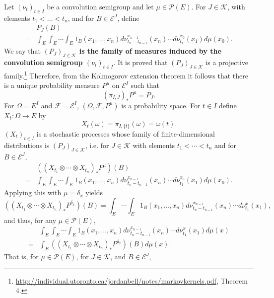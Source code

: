 \documentclass{article}
\theoremstyle{definition}
\begin{document}
Let $(\nu_t)_{t  \in I}$ be a convolution semigroup and let $\mu \in \mathscr{P}(E)$.
For $J \in \mathscr{K}$, with elements $t_1<\ldots<t_n$, and for $B \in \mathscr{E}^J$,
define
\begin{equation}
\begin{split}
&P_J(B)\\
=&\int_E \int_E \cdots \int_E 1_B(x_1,\ldots,x_n)
d\nu_{t_n-t_{n-1}}^{x_{n-1}}(x_n) \cdots d\nu_{t_1}^{x_0} (x_1) d\mu(x_0).
\end{split}
\label{PJ}
\end{equation}
We say that \textbf{$(P_J)_{J \in \mathscr{K}}$ is the family of measures induced by the convolution semigroup
$(\nu_t)_{t \in I}$}.
It is proved that $(P_J)_{J \in \mathscr{K}}$ is a projective family.\footnote{\url{http://individual.utoronto.ca/jordanbell/notes/markovkernels.pdf},
Theorem 4.} Therefore, from the Kolmogorov extension theorem it follows that there is a unique probability measure $P^\mu$ on
$\mathscr{E}^I$ such that 
\begin{equation}
(\pi_{I,J})_* P^\mu = P_J.
\label{376}
\end{equation}
For  $\Omega=E^I$ and $\mathscr{F}=\mathscr{E}^I$, 
$(\Omega,\mathscr{F},P^\mu)$ is a probability space.
For $t \in I$ define $X_t:\Omega \to E$ by
\[
X_t(\omega)=\pi_{I,\{t\}}(\omega) = \omega(t). 
\]
$(X_t)_{t \in I}$ is a stochastic processes whose family of finite-dimensional distributions is
$(P_J)_{J \in \mathscr{K}}$, i.e.
for $J \in \mathscr{K}$ with elements $t_1<\cdots<t_n$ and for $B \in \mathscr{E}^J$,
\[
\begin{split}
&((X_{t_1} \otimes \cdots \otimes X_{t_n})_*P^\mu)(B)\\
=&\int_E \int_E \cdots \int_E 1_B(x_1,\ldots,x_n)
d\nu_{t_n-t_{n-1}}^{x_{n-1}}(x_n) \cdots d\nu_{t_1}^{x_0} (x_1) d\mu(x_0).
\end{split}
\]
Applying this with $\mu=\delta_x$ yields
\[
((X_{t_1} \otimes \cdots \otimes X_{t_n})_*P^{\delta_x})(B)
=\int_E \cdots \int_E  1_B(x_1,\ldots,x_n) d\nu_{t_n-t_{n-1}}^{x_{n-1}}(x_n) \cdots d\nu_{t_1}^{x} (x_1),
\]
and thus, for any $\mu \in \mathscr{P}(E)$,
\[
\begin{split}
&\int_E \int_E \cdots \int_E  1_B(x_1,\ldots,x_n) d\nu_{t_n-t_{n-1}}^{x_{n-1}}(x_n) \cdots d\nu_{t_1}^{x} (x_1) d\mu(x)\\
=&\int_E ((X_{t_1} \otimes \cdots \otimes X_{t_n})_*P^{\delta_x})(B) d\mu(x).
\end{split}
\]
That is, for $\mu \in \mathscr{P}(E)$,
for $J \in \mathscr{K}$, and $B \in \mathscr{E}^J$,
\end{document}
